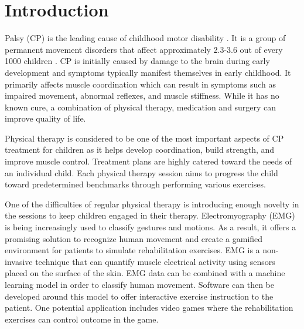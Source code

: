 \documentclass[journal]{IEEEtran}
\begin{document}
	
	
	
	
	
	
	\IEEEpeerreviewmaketitle
	
	
	
	\section{Introduction}
	\label{sec:intro}
	 Palsy (CP) is the leading cause of childhood motor disability \cite{cdcgov2020}. It is a group of permanent movement disorders that affect approximately 2.3-3.6 out of every 1000 children \cite{cporg2020}. CP is initially caused by damage to the brain during early development and symptoms typically manifest themselves in early childhood. It primarily affects muscle coordination which can result in symptoms such as impaired movement, abnormal reflexes, and muscle stiffness. While it has no known cure, a combination of physical therapy, medication and surgery can improve quality of life. 
	
	Physical therapy is considered to be one of the most important aspects of CP treatment for children as it helps develop coordination, build strength, and improve muscle control. Treatment plans are highly catered toward the needs of an individual child. Each physical therapy session aims to progress the child toward predetermined benchmarks through performing various exercises. 
	
	One of the difficulties of regular physical therapy is introducing enough novelty in the sessions to keep children engaged in their therapy. Electromyography (EMG) is being increasingly used to classify gestures and motions. As a result, it offers a promising solution to recognize human movement and create a gamified environment for patients to simulate rehabilitation exercises. EMG is a non-invasive technique that can quantify muscle electrical activity using sensors placed on the surface of the skin. EMG data can be combined with a machine learning model in order to classify human movement. Software can then be developed around this model to offer interactive exercise instruction to the patient. One potential application includes video games where the rehabilitation exercises can control outcome in the game.
	
\end{document}
